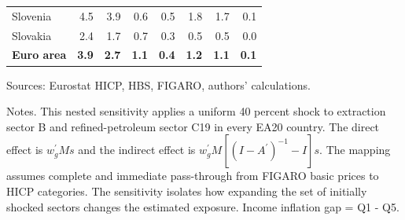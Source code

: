 \begin{table}[H]
\begin{tabular}{lrrrrrrr}
 \\
Slovenia & 4.5 & 3.9 & 0.6 & 0.5 & 1.8 & 1.7 & 0.1
 \\
Slovakia & 2.4 & 1.7 & 0.7 & 0.3 & 0.5 & 0.5 & 0.0
 \\
\midrule
\textbf{Euro area} & \textbf{3.9} & \textbf{2.7} & \textbf{1.1} & \textbf{0.4} & \textbf{1.2} & \textbf{1.1} & \textbf{0.1}
 \\
\bottomrule
\end{tabular}
\par\vspace{0.35em}\footnotesize\noindent Sources: Eurostat HICP, HBS, FIGARO, authors' calculations.
\par\vspace{0.25em}\footnotesize\noindent Notes. This nested sensitivity applies a uniform 40 percent shock to extraction sector B and refined-petroleum sector C19 in every EA20 country. The direct effect is $w_g^{\prime}Ms$ and the indirect effect is $w_g^{\prime}M[(I-A^{\prime})^{-1}-I]s$. The mapping assumes complete and immediate pass-through from FIGARO basic prices to HICP categories. The sensitivity isolates how expanding the set of initially shocked sectors changes the estimated exposure. Income inflation gap = Q1 - Q5.
\end{table}
\vspace{0.6em}
